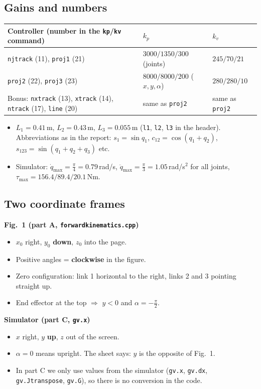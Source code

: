 \documentclass[10pt,a4paper]{article}
\newcommand{\code}[1]{\texttt{#1}}
\begin{document}
\subsection{Gains and numbers}
{\small
\begin{tabular}{@{}lll@{}}
  \toprule
  Controller (number in the \code{kp}/\code{kv} command) & $k_p$ & $k_v$ \\
  \midrule
  \code{njtrack} (11), \code{proj1} (21) & $3000 / 1350 / 300$ (joints) & $245 / 70 / 21$ \\
  \code{proj2} (22), \code{proj3} (23) & $8000 / 8000 / 200$ ($x, y, \alpha$) & $280 / 280 / 10$ \\
  Bonus: \code{nxtrack} (13), \code{xtrack} (14), \code{ntrack} (17), \code{line} (20) & same as \code{proj2} & same as \code{proj2} \\
  \bottomrule
\end{tabular}
}

\begin{itemize}
  \item $L_1 = 0.41$\,m, $L_2 = 0.43$\,m, $L_3 = 0.055$\,m (\code{l1}, \code{l2}, \code{l3} in the header). Abbreviations as
        in the report: $s_1 = \sin q_1$, $c_{12} = \cos(q_1 + q_2)$, $s_{123} = \sin(q_1 + q_2 + q_3)$ etc.
  \item Simulator: $\dot q_{\max} = \frac{\pi}{4} = 0.79$\,rad/s, $\ddot q_{\max} = \frac{\pi}{3} = 1.05$\,rad/s$^2$ for all joints,
        $\tau_{\max} = 156.4 / 89.4 / 20.1$\,Nm.
\end{itemize}

\subsection{Two coordinate frames}
\begin{minipage}[t]{0.49\textwidth}
\textbf{Fig.~1 (part A, \code{forwardkinematics.cpp})}
\begin{itemize}
  \item $x_0$ right, $y_0$ \textbf{down}, $z_0$ into the page.
  \item Positive angles = \textbf{clockwise} in the figure.
  \item Zero configuration: link 1 horizontal to the right, links 2 and 3 pointing straight up.
  \item End effector at the top $\Rightarrow$ $y < 0$ and $\alpha = -\frac{\pi}{2}$.
\end{itemize}
\end{minipage}\hfill
\begin{minipage}[t]{0.49\textwidth}
\textbf{Simulator (part C, \code{gv.x})}
\begin{itemize}
  \item $x$ right, $y$ \textbf{up}, $z$ out of the screen.
  \item $\alpha = 0$ means upright. The sheet says: $y$ is the opposite of Fig.~1.
  \item In part C we only use values from the simulator (\code{gv.x}, \code{gv.dx}, \code{gv.Jtranspose}, \code{gv.G}),
        so there is no conversion in the code.
\end{itemize}
\end{minipage}
\end{document}
